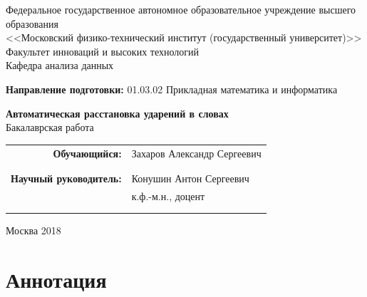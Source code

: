 \documentclass[14pt, a4paper, russian]{extreport}
\begin{document}
\begin{center}
\hfill \break
\small{Федеральное государственное автономное образовательное учреждение \linebreak 
высшего образования}\\ 
\small{<<Московский физико-технический институт (государственный университет)>>}\\
\hfill \break
\small{Факультет инноваций и высоких технологий}\\
\small{Кафедра анализа данных}\\
\end{center}
\small{\textbf{Направление подготовки:} 01.03.02 Прикладная математика и информатика}\\
\hfill \break
\hfill \break
\hfill \break
\hfill \break
\begin{center}
\normalsize{\textbf{Автоматическая расстановка ударений в словах}}\\
\small{Бакалаврская работа}\\
\hfill \break
\hfill \break
\end{center}
 
\hfill \break
 
\begin{flushright}
\small{ 
\begin{tabular}{rl}
\textbf{Обучающийся:} & Захаров Александр Сергеевич \\
 & \underline{\hspace{3cm}} \\\\
\textbf{Научный руководитель:} & Конушин Антон Сергеевич\\
            & к.ф.-м.н., доцент \\
 & \underline{\hspace{3cm}} \\\\
\end{tabular}
}
\end{flushright}

\hfill \break
\hfill \break
\hfill \break
\hfill \break
\begin{center} Москва 2018 \end{center}
\thispagestyle{empty} %
 
 
\newpage
\chapter*{Аннотация}
\end{document}

